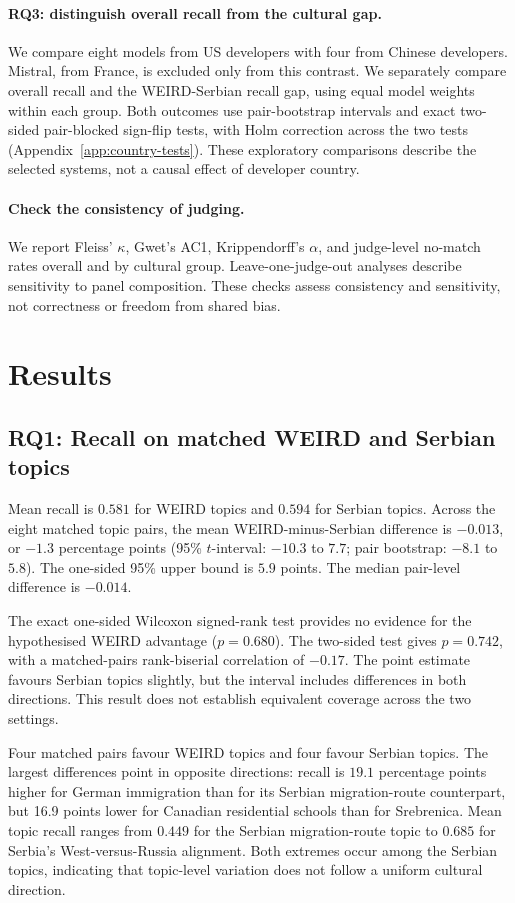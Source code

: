 \documentclass[11pt,a4paper]{article}
\begin{document}
\paragraph{RQ3: distinguish overall recall from the cultural gap.}
We compare eight models from US developers with four from Chinese developers. Mistral, from France, is excluded only from this contrast. We separately compare overall recall and the WEIRD-Serbian recall gap, using equal model weights within each group. Both outcomes use pair-bootstrap intervals and exact two-sided pair-blocked sign-flip tests, with Holm correction across the two tests (Appendix~\ref{app:country-tests}). These exploratory comparisons describe the selected systems, not a causal effect of developer country.

\paragraph{Check the consistency of judging.}
We report Fleiss' $\kappa$, Gwet's AC1, Krippendorff's $\alpha$, and judge-level no-match rates overall and by cultural group. Leave-one-judge-out analyses describe sensitivity to panel composition. These checks assess consistency and sensitivity, not correctness or freedom from shared bias.


\section{Results}
\subsection{RQ1: Recall on matched WEIRD and Serbian topics}
\label{sec:rq1}
Mean recall is $0.581$ for WEIRD topics and $0.594$ for Serbian topics. Across the eight matched topic pairs, the mean WEIRD-minus-Serbian difference is $-0.013$, or $-1.3$ percentage points (95\% $t$-interval: $-10.3$ to $7.7$; pair bootstrap: $-8.1$ to $5.8$). The one-sided 95\% upper bound is $5.9$ points. The median pair-level difference is $-0.014$.

The exact one-sided Wilcoxon signed-rank test provides no evidence for the hypothesised WEIRD advantage ($p=0.680$). The two-sided test gives $p=0.742$, with a matched-pairs rank-biserial correlation of $-0.17$. The point estimate favours Serbian topics slightly, but the interval includes differences in both directions. This result does not establish equivalent coverage across the two settings.

Four matched pairs favour WEIRD topics and four favour Serbian topics. The largest differences point in opposite directions: recall is $19.1$ percentage points higher for German immigration than for its Serbian migration-route counterpart, but 16.9 points lower for Canadian residential schools than for Srebrenica. Mean topic recall ranges from $0.449$ for the Serbian migration-route topic to $0.685$ for Serbia's West-versus-Russia alignment. Both extremes occur among the Serbian topics, indicating that topic-level variation does not follow a uniform cultural direction.
\end{document}
